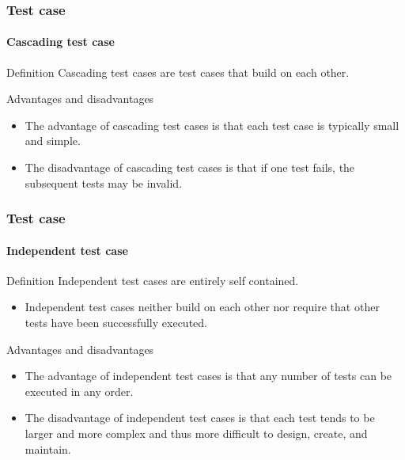 \begin{frame}
\label{concept:cascading-test-case}
\frametitle{Test case}
\framesubtitle{Cascading test case}

\begin{block:concept}{Definition}
Cascading test cases are test cases that build on each other.
\end{block:concept}


\begin{block:fact}{Advantages and disadvantages}
\begin{itemize}
	\item The advantage of cascading test cases is that each test case is
	typically small and simple.

	\item The disadvantage of cascading test cases is that if one test fails,
	the subsequent tests may be invalid.
\end{itemize}
\end{block:fact}

\hfill
{}
\end{frame}



\begin{frame}
\label{concept:independent-test-case}
\frametitle{Test case}
\framesubtitle{Independent test case}

\begin{block:concept}{Definition}
Independent test cases are entirely self contained.
\begin{itemize}
	\item Independent test cases neither build on each other nor require that
	other tests have been successfully executed.
\end{itemize}
\end{block:concept}

\begin{block:fact}{Advantages and disadvantages}
\begin{itemize}
	\item The advantage of independent test cases is that any number of tests
	can be executed in any order.

	\item The disadvantage of independent test cases is that each test tends to
	be larger and more complex and thus more difficult to design, create, and
	maintain.
\end{itemize}
\end{block:fact}
\end{frame}